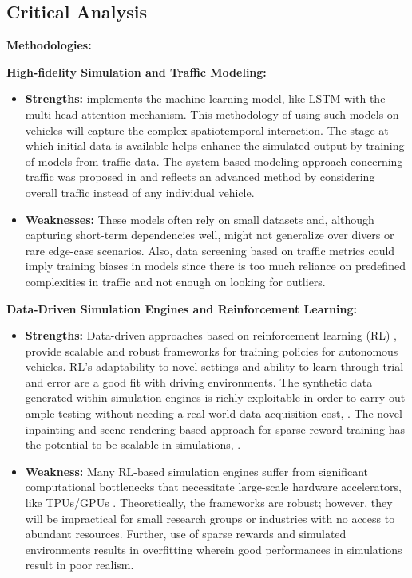\documentclass[lettersize,journal]{IEEEtran}
\begin{document}
\subsection{Critical Analysis}
\textbf{Methodologies:}

\textbf{High-fidelity Simulation and Traffic Modeling:}
\begin{itemize}
    \item \textbf{Strengths:} \cite{ref2} implements the machine-learning model, like LSTM with the multi-head attention mechanism. This methodology of using such models on vehicles will capture the complex spatiotemporal interaction. The stage at which initial data is available helps enhance the simulated output by training of models from traffic data. The system-based modeling approach concerning traffic was proposed in \cite{ref2} and reflects an advanced method by considering overall traffic instead of any individual vehicle.
    \item \textbf{Weaknesses:} These models often rely on small datasets and, although capturing short-term dependencies well, might not generalize over divers or rare edge-case scenarios. Also, data screening based on traffic metrics could imply training biases in models since there is too much reliance on predefined complexities in traffic and not enough on looking for outliers.
\end{itemize}

\vspace{1em} %

\textbf{Data-Driven Simulation Engines and Reinforcement Learning:}
\begin{itemize}
    \item \textbf{Strengths:} Data-driven approaches based on reinforcement learning (RL) \cite{ref3}, \cite{ref5} provide scalable and robust frameworks for training policies for autonomous vehicles. RL's adaptability to novel settings and ability to learn through trial and error are a good fit with driving environments. The synthetic data generated within simulation engines is richly exploitable in order to carry out ample testing without needing a real-world data acquisition cost, \cite{ref10}. The novel inpainting and scene rendering-based approach for sparse reward training has the potential to be scalable in simulations, \cite{ref5}.
    \item \textbf{Weakness:} Many RL-based simulation engines suffer from significant computational bottlenecks that necessitate large-scale hardware accelerators, like TPUs/GPUs \cite{ref4}. Theoretically, the frameworks are robust; however, they will be impractical for small research groups or industries with no access to abundant resources. Further, use of sparse rewards and simulated environments results in overfitting wherein good performances in simulations result in poor realism.
\end{itemize}
\end{document}
